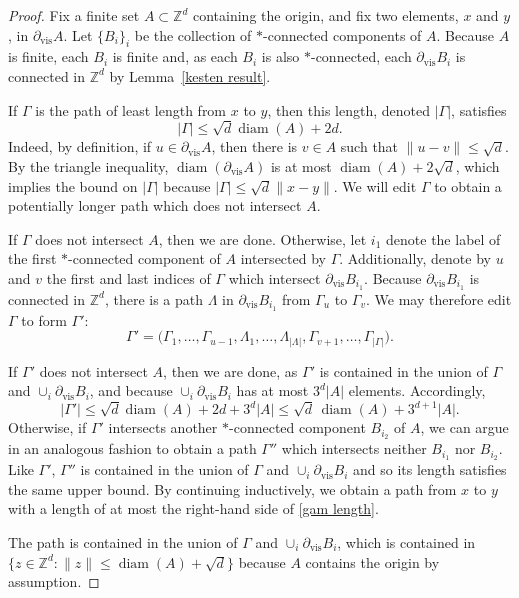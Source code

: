 \documentclass[11pt,reqno]{amsart}
\theoremstyle{definition}
\numberwithin{equation}{section}
\newcommand{\Z}{\mathbb{Z}}
\newcommand{\1}{\mathbf{1}}
\DeclareMathOperator{\diam}{diam}
\newcommand{\bdyvis}{\partial_{\mathrm{vis}}}
\begin{document}
\begin{proof}
Fix a finite set $A \subset \Z^d$ containing the origin, and fix two elements, $x$ and $y$, in $\bdyvis A$. Let $\{B_i\}_i$ be the collection of $\ast$-connected components of $A$. Because $A$ is finite, each $B_i$ is finite and, as each $B_i$ is also $\ast$-connected, each $\bdyvis B_i$ is connected in $\Z^d$ by Lemma~\ref{kesten result}.

If $\Gamma$ is the path of least length from $x$ to $y$, then this length, denoted $|\Gamma|$, satisfies 
\[
|\Gamma| \leq \sqrt{d} \diam (A) + 2d.
\]
Indeed, by definition, if $u \in \bdyvis A$, then there is $v \in A$ such that $\|u-v\| \leq \sqrt{d}$. By the triangle inequality, $\diam (\bdyvis A)$ is at most $\diam (A) + 2\sqrt{d}$, which implies the bound on $|\Gamma|$ because $|\Gamma| \leq \sqrt{d}\|x-y\|$. We will edit $\Gamma$ to obtain a potentially longer path which does not intersect $A$.

If $\Gamma$ does not intersect $A$, then we are done. Otherwise, let $i_1$ denote the label of the first $\ast$-connected component of $A$ intersected by $\Gamma$. Additionally, denote by $u$ and $v$ the first and last indices of $\Gamma$ which intersect $\bdyvis B_{i_1}$. Because $\bdyvis B_{i_1}$ is connected in $\Z^d$, there is a path $\Lambda$ in $\bdyvis B_{i_1}$ from $\Gamma_u$ to $\Gamma_v$. We may therefore edit $\Gamma$ to form $\Gamma'$:
\[ \Gamma' = \big( \Gamma_1, \dots, \Gamma_{u-1}, \Lambda_1, \dots, \Lambda_{|\Lambda|}, \Gamma_{v+1}, \dots, \Gamma_{|\Gamma|} \big). \]

If $\Gamma'$ does not intersect $A$, then we are done, as $\Gamma'$ is contained in the union of $\Gamma$ and $\cup_i \bdyvis B_i$, and because $\cup_i \bdyvis B_i$ has at most $3^d |A|$ elements. Accordingly,
\begin{equation}\label{gam length}
|\Gamma'| \leq \sqrt{d} \diam (A) + 2d + 3^d |A| \leq \sqrt{d}\, \diam (A) + 3^{d+1} |A|.
\end{equation}
Otherwise, if $\Gamma'$ intersects another $\ast$-connected component $B_{i_2}$ of $A$, we can argue in an analogous fashion to obtain a path $\Gamma''$ which intersects neither $B_{i_1}$ nor $B_{i_2}$. Like $\Gamma'$, $\Gamma''$ is contained in the union of $\Gamma$ and $\cup_i \bdyvis B_i$ and so its length satisfies the same upper bound. By continuing inductively, we obtain a path from $x$ to $y$ with a length of at most the right-hand side of \eqref{gam length}.

The path is contained in the union of $\Gamma$ and $\cup_i \bdyvis B_i$, which is contained in $\{z \in \Z^d: \|z\| \leq \diam (A) + \sqrt{d}\}$ because $A$ contains the origin by assumption.
\end{proof}
\end{document}
